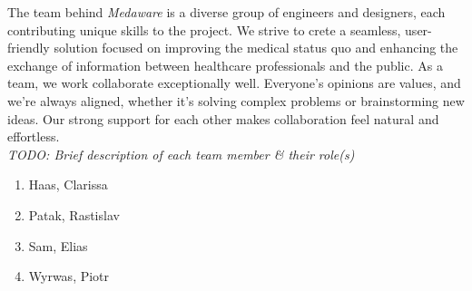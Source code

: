 The team behind \textit{Medaware} is a diverse group of engineers and designers, each contributing unique skills to the project.
We strive to crete a seamless, user-friendly solution focused on improving the medical status quo and enhancing the exchange of
information between healthcare professionals and the public. As a team, we work collaborate exceptionally well. Everyone's
opinions are values, and we're always aligned, whether it's solving complex problems or brainstorming new ideas.
Our strong support for each other makes collaboration feel natural and effortless.\\[2\baselineskip]
\textit{TODO: Brief description of each team member \& their role(s)}
\begin{enumerate}
	\item Haas, Clarissa
	\item Patak, Rastislav
	\item Sam, Elias
	\item Wyrwas, Piotr
\end{enumerate}
